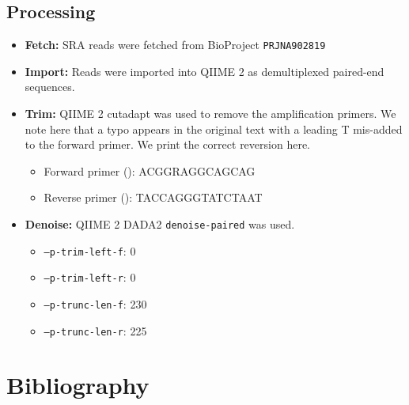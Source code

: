 \documentclass[11pt,a4paper]{article}
\begin{document}
\subsection{Processing}
\begin{itemize}
\item \textbf{Fetch:} SRA reads were fetched from BioProject \texttt{PRJNA902819}
\item \textbf{Import:} Reads were imported into QIIME 2 as demultiplexed paired-end sequences.
\item \textbf{Trim:} QIIME 2 cutadapt was used to remove the amplification primers. We note here that a typo appears in the original text with a leading T mis-added to the forward primer. We print the correct reversion here. 
  \begin{itemize}
  \item Forward primer (): ACGGRAGGCAGCAG
  \item Reverse primer (): TACCAGGGTATCTAAT
  \end{itemize}
\item \textbf{Denoise:} QIIME 2 DADA2 \texttt{denoise-paired} was used.
  \begin{itemize}
  \item \texttt{--p-trim-left-f}: 0
  \item \texttt{--p-trim-left-r}: 0
  \item \texttt{--p-trunc-len-f}: 230
  \item \texttt{--p-trunc-len-r}: 225
  \end{itemize}
\end{itemize}



\newpage
\section{Bibliography}
\printbibliography[heading=bibintoc]
\end{document}
